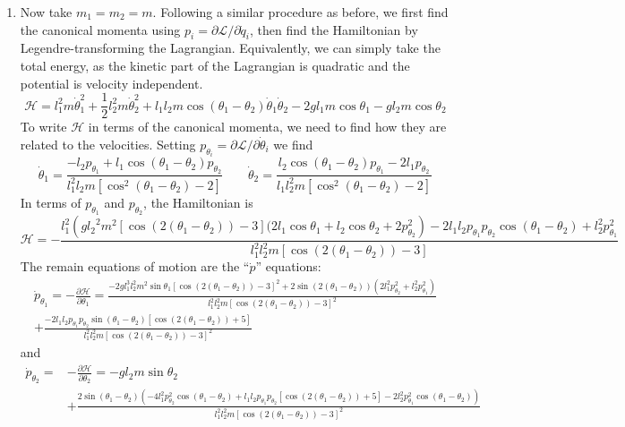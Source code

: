 \documentclass{article}
\theoremstyle{definition}
\newcommand{\p}{\partial}
\newcommand{\lag}{\mathcal{L}}
\newcommand{\ham}{\mathcal{H}}
\newcommand{\f}[2]{\frac{#1}{#2}}
\begin{document}
\begin{enumerate}[label=(\alph*)]
	
	\item Now take $m_1 = m_2 = m$. Following a similar procedure as before, we first find the canonical momenta using $p_i = \p \lag / \p \dot{q}_i$, then find the Hamiltonian by Legendre-transforming the Lagrangian. Equivalently, we can simply take the total energy, as the kinetic part of the Lagrangian is quadratic and the potential is velocity independent. 
	\begin{equation*}
	\boxed{\ham = l_1^2 m \dot\theta_1^2 +\f{1}{2}l_2^2 m \dot\theta_2^2 + l_1l_2m\cos(\theta_1-\theta_2)\dot\theta_1\dot\theta_2 - 2gl_1m\cos\theta_1 - g l_2 m \cos\theta_2 }
	\end{equation*}
	To write $\ham$ in terms of the canonical momenta, we need to find how they are related to the velocities. Setting $p_{\theta_i} = \p \lag / \p \dot{\theta}_i$ we find 
	\begin{equation*}
	\dot{\theta}_1 = \f{-l_2 p_{\theta_1} + l_1\cos(\theta_1-\theta_2)p_{\theta_2}}{l_1^2 l_2 m [\cos^2(\theta_1 - \theta_2) - 2]}
	\quad\quad 
	\dot{\theta}_2 = \f{l_2\cos(\theta_1-\theta_2)p_{\theta_1} - 2l_1 p_{\theta_2}}{l_1l_2^2 m [\cos^2(\theta_1 - \theta_2)-2]}
	\end{equation*}
	In terms of $p_{\theta_1}$ and $p_{\theta_2}$, the Hamiltonian is 
	\begin{equation*}
	\boxed{\ham = 
	-\frac{l_1^2 \left(g{l_2}^2 m^2 [\cos (2 (\theta_1-\theta_2))-3] 
	(2l_1 \cos \theta_1+l_2 \cos \theta_2 + 2p_{\theta_2}^2\right)
	-2l_1l_2p_{\theta_1}p_{\theta_2} \cos (\theta_1-\theta_2)+ l_2^2 p_{\theta_1}^2}
	{l_1^2l_2^2 m [\cos (2 (\theta_1-\theta_2))-3]}}
	\end{equation*}
	The remain equations of motion are the ``$\dot{p}$'' equations:
	\begin{align*}
	\dot{p}_{\theta_1} = -\f{\p \ham}{\p \theta_1}  = 
	\frac{-2 g l_1^3 l_2^2 m^2 \sin \theta_1[\cos
		(2 (\theta_1-\theta_2))-3]^2
		+2 \sin (2
		(\theta_1-\theta_2)) \left(2 l_1^2
		p_{\theta_2}^2+l_2^2 p_{\theta_1}^2\right)
		}
	{l_1^2 l_2^2 m [\cos (2
		(\theta_1-\theta_2))-3]^2} \\
	+ \frac{-2
		l_1l_2 p_{\theta_1}p_{\theta_2} \sin
		(\theta_1-\theta_2) [\cos (2 (\theta_1-\theta_2))+5]}{l_1^2 l_2^2 m [\cos (2
		(\theta_1-\theta_2))-3]^2}
	\end{align*}
	and 
	\begin{align*}
	\dot{p}_{\theta_2} = &-\f{\p \ham}{\p \theta_2}
	= 
	- g l_2 m \sin\theta_2 \\
	&+\frac{2 \sin (\theta_1-\theta_2) \left(-4
		l_1^2 p_{\theta_2}^2 \cos (\theta_1-\theta_2)+l_1 l_2 p_{\theta_1}p_{\theta_2} [\cos (2 (\theta_1-\theta_2))+5]-2 l_2^2 p_{\theta_1}^2 \cos (\theta_1-\theta_2)\right)}{l_1^2 l_2^2 m [\cos (2 (\theta_1-\theta_2))-3]^2}
	\end{align*}
	

\end{enumerate}
\end{document}
